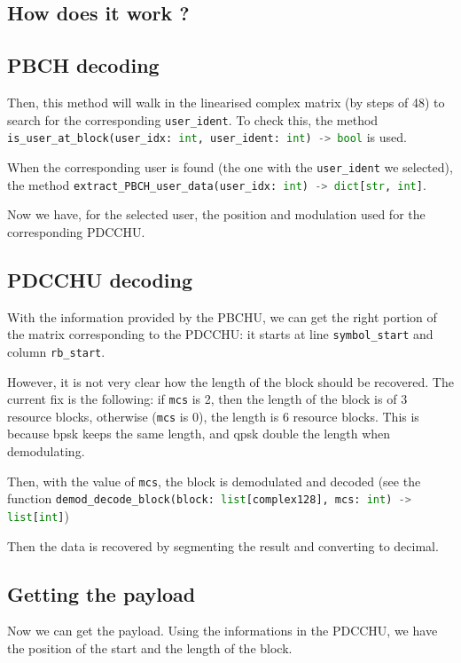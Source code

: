 \documentclass[a4paper, 12pt, twoside]{article}
\begin{document}
\begin{indt}{\section{How does it work ?}}
\begin{indt}{\subsection{PBCH decoding}}
            Then, this method will walk in the linearised complex matrix (by steps of 48) to search for the corresponding \texttt{user\_ident}.
            To check this, the method \lstinline[language=python]{is_user_at_block(user_idx: int, user_ident: int) -> bool} is used.

            When the corresponding user is found (the one with the \texttt{user\_ident} we selected), the method \lstinline[language=python]{extract_PBCH_user_data(user_idx: int) -> dict[str, int]}.

            \vspace{12pt}
            
            Now we have, for the selected user, the position and modulation used for the corresponding PDCCHU.
        \end{indt} %

        \begin{indt}{\subsection{PDCCHU decoding}} %
            With the information provided by the PBCHU, we can get the right portion of the matrix corresponding to the PDCCHU: it starts at line \texttt{symbol\_start} and column \texttt{rb\_start}.

            However, it is not very clear how the length of the block should be recovered. The current fix is the following: if \texttt{mcs} is 2, then the length of the block is of 3 resource blocks, otherwise (\texttt{mcs} is 0), the length is 6 resource blocks.
            This is because bpsk keeps the same length, and qpsk double the length when demodulating.

            Then, with the value of \texttt{mcs}, the block is demodulated and decoded (see the function \lstinline[language=python]{demod_decode_block(block: list[complex128], mcs: int) -> list[int]})

            Then the data is recovered by segmenting the result and converting to decimal.
        \end{indt} %

        \begin{indt}{\subsection{Getting the payload}} %
            Now we can get the payload.
            Using the informations in the PDCCHU, we have the position of the start and the length of the block.


\end{indt}
\end{indt}
\end{document}

